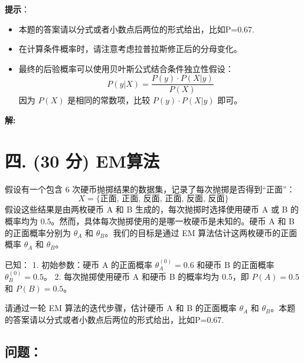 \documentclass[8pt]{article}
\begin{document}
\textbf{提示}：
\begin{itemize}
    \item 本题的答案请以分式或者小数点后两位的形式给出，比如P=0.67.
    \item 在计算条件概率时，请注意考虑拉普拉斯修正后的分母变化。
    \item 最终的后验概率可以使用贝叶斯公式结合条件独立性假设：
    \[
    P(y|X) = \frac{P(y) \cdot P(X|y)}{P(X)}
    \]
    因为 \( P(X) \) 是相同的常数项，比较 \( P(y) \cdot P(X|y) \) 即可。
\end{itemize}

\textbf{\large 解:}


\vspace{3em}

\section*{四. (30 分) EM算法}
假设有一个包含 6 次硬币抛掷结果的数据集，记录了每次抛掷是否得到“正面”：
\[
X = \{\text{正面, 正面, 反面, 正面, 反面, 反面}\}
\]
假设这些结果是由两枚硬币 A 和 B 生成的，每次抛掷时选择使用硬币 A 或 B 的概率均为 \(0.5\)。然而，具体每次抛掷使用的是哪一枚硬币是未知的。硬币 A 和 B 的正面概率分别为 \( \theta_A \) 和 \( \theta_B \)。我们的目标是通过 EM 算法估计这两枚硬币的正面概率 \( \theta_A \) 和 \( \theta_B \)。

已知：
1. 初始参数：硬币 A 的正面概率 \( \theta_A^{(0)} = 0.6 \) 和硬币 B 的正面概率 \( \theta_B^{(0)} = 0.5 \)。
2. 每次抛掷使用硬币 A 和硬币 B 的概率均为 0.5，即 \( P(A) = 0.5 \) 和 \( P(B) = 0.5 \)。

请通过一轮 EM 算法的迭代步骤，估计硬币 A 和 B 的正面概率 \( \theta_A \) 和 \( \theta_B \)。本题的答案请以分式或者小数点后两位的形式给出，比如P=0.67.

\subsection*{问题：}
\end{document}
